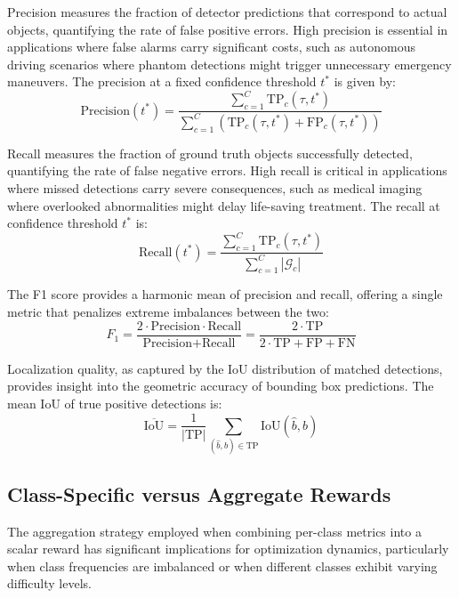 Precision measures the fraction of detector predictions that correspond to actual objects, quantifying the rate of false positive errors. High precision is essential in applications where false alarms carry significant costs, such as autonomous driving scenarios where phantom detections might trigger unnecessary emergency maneuvers. The precision at a fixed confidence threshold $t^*$ is given by:
\begin{equation}
\text{Precision}(t^*) = \frac{\sum_{c=1}^{C} \text{TP}_c(\tau, t^*)}{\sum_{c=1}^{C} (\text{TP}_c(\tau, t^*) + \text{FP}_c(\tau, t^*))}
\label{eq:precision_fixed}
\end{equation}

Recall measures the fraction of ground truth objects successfully detected, quantifying the rate of false negative errors. High recall is critical in applications where missed detections carry severe consequences, such as medical imaging where overlooked abnormalities might delay life-saving treatment. The recall at confidence threshold $t^*$ is:
\begin{equation}
\text{Recall}(t^*) = \frac{\sum_{c=1}^{C} \text{TP}_c(\tau, t^*)}{\sum_{c=1}^{C} |\mathcal{G}_c|}
\label{eq:recall_fixed}
\end{equation}

The F1 score provides a harmonic mean of precision and recall, offering a single metric that penalizes extreme imbalances between the two:
\begin{equation}
F_1 = \frac{2 \cdot \text{Precision} \cdot \text{Recall}}{\text{Precision} + \text{Recall}} = \frac{2 \cdot \text{TP}}{2 \cdot \text{TP} + \text{FP} + \text{FN}}
\label{eq:f1_score}
\end{equation}

Localization quality, as captured by the IoU distribution of matched detections, provides insight into the geometric accuracy of bounding box predictions. The mean IoU of true positive detections is:
\begin{equation}
\overline{\text{IoU}} = \frac{1}{|\text{TP}|} \sum_{(\hat{b}, b) \in \text{TP}} \text{IoU}(\hat{b}, b)
\label{eq:mean_iou}
\end{equation}

\subsection{Class-Specific versus Aggregate Rewards}

The aggregation strategy employed when combining per-class metrics into a scalar reward has significant implications for optimization dynamics, particularly when class frequencies are imbalanced or when different classes exhibit varying difficulty levels.

